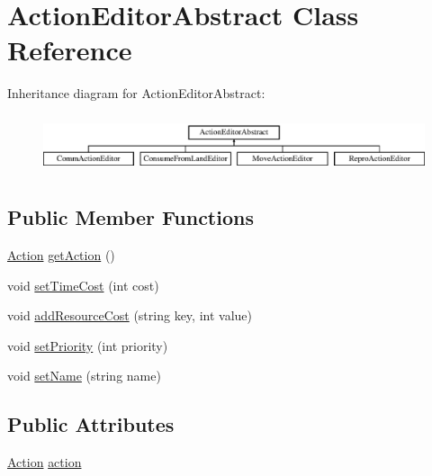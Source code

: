 \hypertarget{class_action_editor_abstract}{}\section{Action\+Editor\+Abstract Class Reference}
\label{class_action_editor_abstract}
Inheritance diagram for Action\+Editor\+Abstract\+:\begin{figure}[H]
\begin{center}
\leavevmode
\includegraphics[height=1.728395cm]{class_action_editor_abstract}
\end{center}
\end{figure}
\subsection*{Public Member Functions}
\begin{DoxyCompactItemize}
\item 
\mbox{\hyperlink{class_action}{Action}} \mbox{\hyperlink{class_action_editor_abstract_a7c529d2f6fd2c7db4f8451cb90aabe75}{get\+Action}} ()
\item 
void \mbox{\hyperlink{class_action_editor_abstract_aa6da20f7ed4358957d5c4a0d3b191877}{set\+Time\+Cost}} (int cost)
\item 
void \mbox{\hyperlink{class_action_editor_abstract_a85dfd2bcf2a86bb45c2cafeed4d4b9fc}{add\+Resource\+Cost}} (string key, int value)
\item 
void \mbox{\hyperlink{class_action_editor_abstract_a2b18204979082f6227f55e357cdcc5d5}{set\+Priority}} (int priority)
\item 
void \mbox{\hyperlink{class_action_editor_abstract_a15e82c4d5b251a80396ae635fd1f0fa2}{set\+Name}} (string name)
\end{DoxyCompactItemize}
\subsection*{Public Attributes}
\begin{DoxyCompactItemize}
\item 
\mbox{\hyperlink{class_action}{Action}} \mbox{\hyperlink{class_action_editor_abstract_a58e0f5d65d95e8e4b80a0b3d5e82ce7b}{action}}
\end{DoxyCompactItemize}


